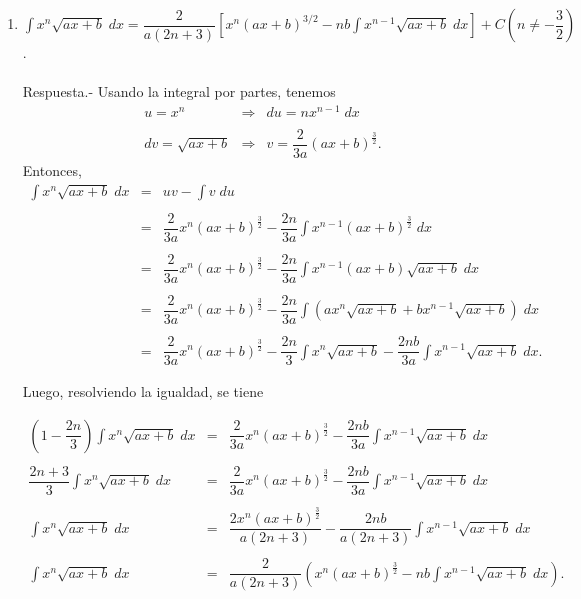 \begin{enumerate}[\bfseries 1.]
    \item $\displaystyle\int x^n \sqrt{ax+b}\; dx = \dfrac{2}{a(2n+3)}\left[x^n(ax+b)^{3/2}-nb\int x^{n-1}\sqrt{ax+b}\; dx\right]+C\left(n\neq -\dfrac{3}{2}\right)$.\\\\
	Respuesta.-\; Usando la integral por partes, tenemos
	$$
	\begin{array}{rcl}
	    u=x^n &\Rightarrow& du=nx^{n-1}\; dx\\\\
	    dv=\sqrt{ax+b} &\Rightarrow& v=\dfrac{2}{3a}(ax+b)^{\frac{3}{2}}.
	\end{array}
	$$
	Entonces,
	$$
	\begin{array}{rcl}
	    \displaystyle\int x^n\sqrt{ax+b}\; dx &=& uv-\displaystyle\int v\; du\\\\
						  &=& \dfrac{2}{3a}x^n  (ax+b)^{\frac{3}{2}} - \dfrac{2n}{3a}\displaystyle\int x^{n-1}(ax+b)^{\frac{3}{2}}\; dx\\\\
						  &=& \dfrac{2}{3a}x^n (ax+b)^{\frac{3}{2}} - \dfrac{2n}{3a} \displaystyle\int x^{n-1}(ax+b)\sqrt{ax+b}\; dx\\\\
						  &=& \dfrac{2}{3a}x^n (ax+b)^{\frac{3}{2}} - \dfrac{2n}{3a} \displaystyle\int \left(ax^n\sqrt{ax+b}+bx^{n-1}\sqrt{ax+b}\right)\; dx\\\\
						  &=& \dfrac{2}{3a}x^n (ax+b)^{\frac{3}{2}} - \dfrac{2n}{3} \displaystyle\int x^n\sqrt{ax+b} - \dfrac{2nb}{3a}\int x^{n-1} \sqrt{ax+b}\; dx.
	\end{array}
	$$

	Luego, resolviendo la igualdad, se tiene

	$$
	\begin{array}{rcl}
	    \left(1-\dfrac{2n}{3}\right)\displaystyle\int x^n \sqrt{ax+b}\; dx &=& \dfrac{2}{3a}x^n\left(ax+b\right)^{\frac{3}{2}} - \dfrac{2nb}{3a}\displaystyle\int x^{n-1}\sqrt{ax+b}\; dx\\\\
	    \dfrac{2n+3}{3} \displaystyle\int x^n \sqrt{ax+b}\; dx  &=& \dfrac{2}{3a}x^n\left(ax+b\right)^{\frac{3}{2}} - \dfrac{2nb}{3a}\displaystyle\int x^{n-1}\sqrt{ax+b}\; dx\\\\
	    \displaystyle\int x^n \sqrt{ax+b}\; dx &=& \dfrac{2x^n(ax+b)^{\frac{3}{2}}}{a(2n+3)}-\dfrac{2nb}{a(2n+3)}\displaystyle\int x^{n-1}\sqrt{ax+b}\; dx\\\\
	    \displaystyle\int x^n \sqrt{ax+b}\; dx &=& \dfrac{2}{a(2n+3)}\left(x^n(ax+b)^{\frac{3}{2}}-nb\displaystyle\int x^{n-1}\sqrt{ax+b}\; dx\right).
	\end{array}
	$$
	\vspace{0.5cm}


\end{enumerate}
